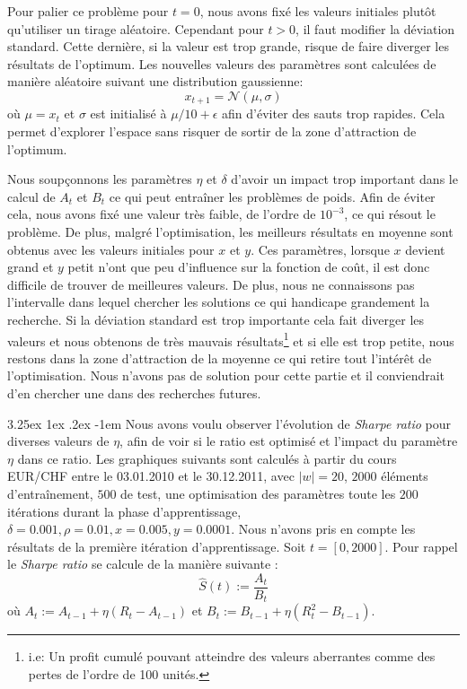 \documentclass[a4paper, 11pt]{article}
\makeatletter
\renewcommand\paragraph{\@startsection{paragraph}{5}{\z@}%
  {3.25ex \@plus1ex \@minus.2ex}%
  {-1em}%
  {\normalfont\normalsize\bfseries}}
\makeatother
\begin{document}
  Pour palier ce problème pour $t=0$, nous avons fixé les valeurs initiales plutôt qu'utiliser un tirage aléatoire. Cependant pour $t>0$, il
  faut modifier la déviation standard. Cette dernière, si la valeur est trop grande, risque de faire diverger les résultats de l'optimum.
  Les nouvelles valeurs des paramètres sont calculées de manière aléatoire suivant une distribution gaussienne:
  $$x_{t+1} = \mathcal{N}(\mu, \sigma)$$
  où $\mu = x_t$ et $\sigma$ est initialisé à $\mu/10 + \epsilon$ afin d'éviter des sauts trop rapides. Cela permet d'explorer l'espace sans risquer de
  sortir de la zone d'attraction de l'optimum.
 
 Nous soupçonnons les paramètres $\eta$ et $\delta$ d'avoir un impact trop important dans le calcul de $A_t$ et $B_t$ ce qui peut entraîner les
 problèmes de poids. Afin de éviter cela, nous avons fixé une valeur très faible, de l'ordre de $10^{-3}$, ce qui résout le problème.
 De plus, malgré l'optimisation, les meilleurs résultats en moyenne sont obtenus avec les valeurs initiales pour $x$ et $y$. Ces paramètres, lorsque 
 $x$ devient grand et $y$ petit n'ont que peu d'influence sur la fonction de coût, il est donc difficile de trouver de meilleures valeurs.
 De plus, nous ne connaissons pas l'intervalle dans lequel chercher les solutions ce qui handicape grandement la recherche. Si la déviation standard est trop importante cela fait diverger les valeurs et nous obtenons de très mauvais résultats\footnote{i.e: Un profit cumulé pouvant atteindre des valeurs aberrantes comme des pertes de l'ordre de 100 unités.} et si elle est trop petite, nous restons dans
 la zone d'attraction de la moyenne ce qui retire tout l'intérêt de l'optimisation.
 Nous n'avons pas de solution pour cette partie et il conviendrait d'en chercher une dans des recherches futures.
 
  \paragraph{}
 Nous avons voulu observer l'évolution de \textit{Sharpe ratio} pour diverses valeurs de $\eta$, afin de voir si le ratio est optimisé et l'impact
 du paramètre $\eta$ dans ce ratio. Les graphiques suivants sont calculés à partir du cours EUR/CHF entre le 03.01.2010 et le 30.12.2011, avec 
 $|w| = 20$, $2000$ éléments d'entraînement, $500$ de test, une optimisation des
 paramètres toute les $200$ itérations durant la phase d'apprentissage, $\delta = 0.001, \rho=0.01, x = 0.005, y=0.0001$. Nous n'avons pris en compte 
 les résultats de la première itération d'apprentissage. Soit $t= [0,2000]$.
 Pour rappel le \textit{Sharpe ratio} se calcule de la manière suivante :
 $$\widehat{S}(t) := \frac{A_t}{B_t}$$
 où $A_t := A_{t-1} + \eta (R_t - A_{t-1})$ et $B_t := B_{t-1} + \eta (R_t^2 - B_{t-1})$.
 
\end{document}
